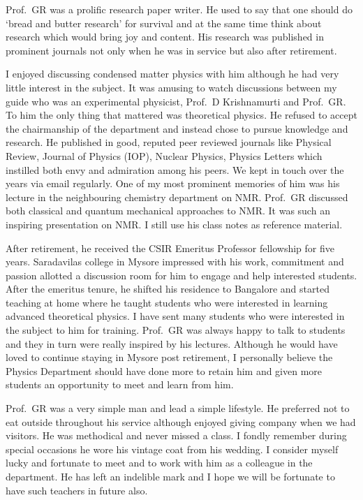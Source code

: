 Prof.\ GR was a prolific research paper writer. He used to say that one should do `bread and butter research' for survival and at the same time think about research which would bring joy and content. His research was published in prominent journals not only when he was in service but also after retirement.

I enjoyed discussing condensed matter physics with him although he had very little interest in the subject. It was
amusing to watch discussions between my guide who was an experimental physicist, Prof.\ D Krishnamurti and
Prof.\ GR. To him the only thing that mattered was theoretical physics. He refused to accept the chairmanship
of the department and instead chose to pursue knowledge and research. He published in good, reputed peer
reviewed journals like Physical Review, Journal of Physics (IOP), Nuclear Physics, Physics Letters which instilled
both envy and admiration among his peers. We kept in touch over the years via email regularly. One of my most prominent memories of him was his lecture in the neighbouring chemistry department on NMR. Prof.\ GR discussed 
both classical and quantum mechanical approaches to NMR. It was such an inspiring presentation on NMR. I still
use his class notes as reference material.

After retirement, he received the CSIR Emeritus Professor fellowship for five years. Saradavilas college in
Mysore impressed with his work, commitment and passion allotted a discussion room for him to engage and
help interested students. After the emeritus tenure, he shifted his residence to Bangalore and started teaching at
home where he taught students who were interested in learning advanced theoretical physics. I have sent many
students who were interested in the subject to him for training. Prof.\ GR was always happy to talk to students and
they in turn were really inspired by his lectures. Although he would have loved to continue staying in Mysore post
retirement, I personally believe the Physics Department should have done more to retain him and given more
students an opportunity to meet and learn from him.
\newpage

Prof.\ GR was a very simple man and lead a simple lifestyle. He preferred not to eat outside throughout his
service although enjoyed giving company when we had visitors. He was methodical and never missed a class. I
fondly remember during special occasions he wore his vintage coat from his wedding. I consider myself lucky and
fortunate to meet and to work with him as a colleague in the department. He has left an indelible mark and I
hope we will be fortunate to have such teachers in future also.

